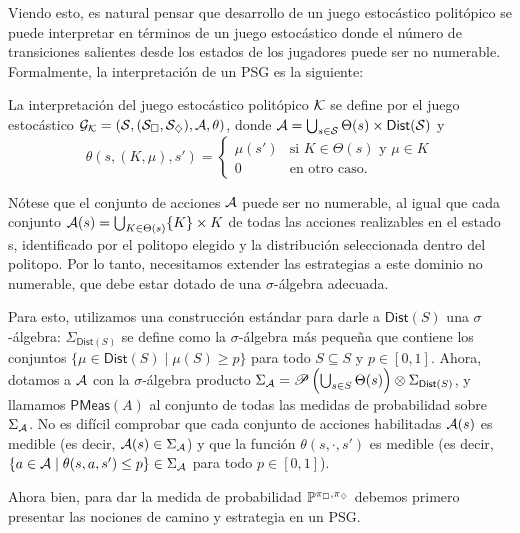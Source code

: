 Viendo esto, es natural pensar que desarrollo de un juego estocástico
politópico se puede interpretar en términos de un juego estocástico donde el
número de transiciones salientes desde los estados de los jugadores puede ser
no numerable. Formalmente, la interpretación de un PSG es la siguiente:

\begin{definition}
	La interpretación del juego estocástico politópico \( \mathcal{K} \) se define por el juego estocástico \( \mathcal{G}_{\mathcal{K}} = (\mathcal{S}, (\mathcal{S}_\square, \mathcal{S}_\diamondsuit), \mathcal{A}, \theta) \), donde \( \mathcal{A} = \bigcup_{s \in \mathcal{S}} \Theta(s) \times \textsf{Dist}(\mathcal{S}) \) y
	\[
		\theta(s, (K, \mu), s') =
		\begin{cases}
			\mu(s') & \text{si } K \in \Theta(s) \text{ y } \mu \in K \\
			0 & \text{en otro caso}.
		\end{cases}
	\]
\end{definition}

Nótese que el conjunto de acciones \( \mathcal{A} \) puede ser no numerable, al igual
que cada conjunto \( \mathcal{A}(s) = \bigcup_{K \in \Theta(s)} \{K\} \times K \) de
todas las acciones realizables en el estado s, identificado por el politopo
elegido y la distribución seleccionada dentro del politopo. Por lo tanto,
necesitamos extender las estrategias a este dominio no numerable, que debe
estar dotado de una \( \sigma \)-álgebra adecuada.

Para esto, utilizamos una construcción estándar para darle a \(
\textsf{Dist}(S) \) una \( \sigma \)-álgebra: \( \Sigma_{\textsf{Dist}(S)} \)
se define como la \( \sigma \)-álgebra más pequeña que contiene los conjuntos
\( \{\mu \in \textsf{Dist}(S) \mid \mu(S) \geq p\} \) para todo \( S \subseteq
S \) y \( p \in [0, 1] \). Ahora, dotamos a \( \mathcal{A} \) con la \( \sigma
\)-álgebra producto \( \Sigma_{\mathcal{A}} = \mathscr{P} \left(\bigcup_{s \in S}
\Theta(s)\right) \otimes \Sigma_{\textsf{Dist}(S)} \), y llamamos \( \textsf{PMeas}(A)
\) al conjunto de todas las medidas de probabilidad sobre \( \Sigma_{\mathcal{A}} \). No
es difícil comprobar que cada conjunto de acciones habilitadas \( \mathcal{A}(s) \) es
medible (es decir, \( \mathcal{A}(s) \in \Sigma_{\mathcal{A}} \)) y que la función \( \theta(s,
\cdot, s') \) es medible (es decir, \( \{a \in \mathcal{A} \mid \theta(s, a, s') \leq
p\} \in \Sigma_{\mathcal{A}} \) para todo \( p \in [0, 1] \)).

Ahora bien, para dar la medida de probabilidad $\mathbb{P}^{\pi_\square, \pi_\diamondsuit}$
debemos primero presentar las nociones de camino y estrategia en un PSG.

